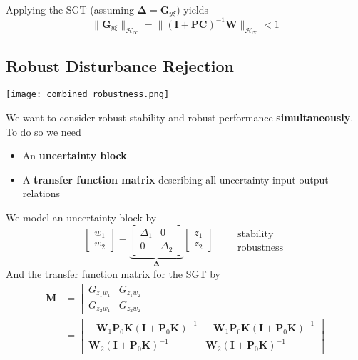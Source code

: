 Applying the SGT (assuming $\boldsymbol{\Delta}=\mathbf{G}_{y\xi}$) yields
\begin{equation*}
    \|\mathbf{G}_{y\xi}\|_{\mathcal{H}_\infty}=\|{(\mathbf{I}+\mathbf{PC})}^{-1}\mathbf{W}\|_{\mathcal{H}_\infty}<1
\end{equation*}

\subsection{Robust Disturbance Rejection}
\begin{center}
    \texttt{[image: combined\_robustness.png]}
\end{center}
We want to consider robust stability and robust performance \textbf{simultaneously}. To do so we need
\begin{itemize}
    \item An \textbf{uncertainty block}
    \item A \textbf{transfer function matrix} describing all uncertainty input-output relations
\end{itemize}
We model an uncertainty block by
\begin{equation*}\label{diag_unc_block}
    \begin{bmatrix}
        w_1 \\
        w_2
    \end{bmatrix}
    =\underbrace{\begin{bmatrix}
            \Delta_1 & 0        \\
            0        & \Delta_2
        \end{bmatrix}}_{\boldsymbol{\Delta}}
    \begin{bmatrix}z_1 \\
        z_2
    \end{bmatrix}\qquad
    \begin{matrix}
        \mathrm{stability} \\
        \mathrm{robustness}
    \end{matrix}
\end{equation*}
And the transfer function matrix for the SGT by
\begin{align*}
    \mathbf{M} & =
    \begin{bmatrix}
        G_{{z_{1}w_{1}}} & G_{{z_{1}w_{2}}} \\
        G_{{z_{2}w_{1}}} & G_{{z_{2}w_{2}}}
    \end{bmatrix}                                                                                                                                                                                                                  \\
               & =\begin{bmatrix}
                      -\mathbf{W}_1\mathbf{P}_0\mathbf{K}{(\mathbf{I}+\mathbf{P}_0\mathbf{K})}^{-1} & -\mathbf{W}_1 \mathbf{P}_0\mathbf{K}{(\mathbf{I}+\mathbf{P}_0\mathbf{K})}^{-1} \\
                      \mathbf{W}_2{(\mathbf{I}+\mathbf{P}_0\mathbf{K})}^{-1}                        & \mathbf{W}_2{(\mathbf{I}+\mathbf{P}_0\mathbf{K})}^{-1}
                  \end{bmatrix}
\end{align*}
